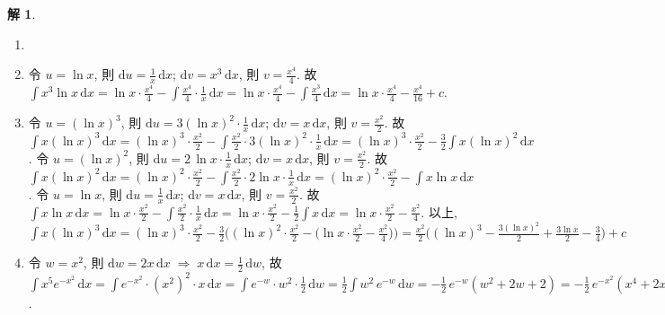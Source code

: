 \documentclass[12pt,a4paper]{extarticle}
\newcommand{\ds}{\displaystyle}
\newcommand{\ie}{\;\Longrightarrow\;}
\theoremstyle{definition}
\newtheorem*{sol}{解}
\begin{document}
\begin{sol}
  \begin{enumerate}\setlength{\itemsep}{0pt}
    \item[]
    \item 令 $\ds u = \ln x$, 則 $\ds\text{d}u = \frac{1}{x}\,\text{d}x$; $\ds\text{d}v = x^3\,\text{d}x$, 則 $\ds v = \frac{x^4}{4}$.  故 $\ds\int x^3\ln x\,\mathrm{d}x = \ln x\cdot\frac{x^4}{4} - \int\!\frac{x^4}{4}\cdot\frac{1}{x}\,\text{d}x = \ln x\cdot\frac{x^4}{4} - \int\!\frac{x^3}{4}\,\text{d}x = \ln x\cdot\frac{x^4}{4} - \frac{x^4}{16} + c$.   
    \item 令 $\ds u = (\ln x)^3$, 則 $\ds\text{d}u = 3(\ln x)^2\cdot\frac{1}{x}\,\text{d}x$; $\ds\text{d}v = x\,\text{d}x$, 則 $\ds v = \frac{x^2}{2}$.  故 $\ds\int x(\ln x)^3\,\mathrm{d}x = (\ln x)^3\cdot\frac{x^2}{2} - \int\!\frac{x^2}{2}\cdot 3(\ln x)^2\cdot\frac{1}{x}\,\text{d}x = (\ln x)^3\cdot\frac{x^2}{2} - \frac{3}{2}\int x(\ln x)^2\,\text{d}x$. 令 $\ds u = (\ln x)^2$, 則 $\ds\text{d}u = 2\,\ln x\cdot\frac{1}{x}\,\text{d}x$; $\ds\text{d}v = x\,\text{d}x$, 則 $\ds v = \frac{x^2}{2}$.  故 $\ds\int x(\ln x)^2\,\text{d}x = (\ln x)^2\cdot\frac{x^2}{2} - \int\!\frac{x^2}{2}\cdot 2\ln x\cdot\frac{1}{x}\,\text{d}x = (\ln x)^2\cdot\frac{x^2}{2} - \int x\ln x\,\text{d}x$. 令 $\ds u = \ln x$, 則 $\ds\text{d}u = \frac{1}{x}\,\text{d}x$; $\ds\text{d}v = x\,\text{d}x$, 則 $\ds v = \frac{x^2}{2}$. 故 $\ds\int x\ln x\,\text{d}x = \ln x\cdot\frac{x^2}{2} - \int\!\frac{x^2}{2}\cdot\frac{1}{x}\,\text{d}x = \ln x\cdot\frac{x^2}{2} - \frac{1}{2}\int x\,\text{d}x = \ln x\cdot\frac{x^2}{2} - \frac{x^2}{4}$. 以上, $\ds\int x(\ln x)^3\,\mathrm{d}x = (\ln x)^3\cdot\frac{x^2}{2} - \frac{3}{2}\Big((\ln x)^2\cdot\frac{x^2}{2} - \big(\ln x\cdot\frac{x^2}{2} - \frac{x^2}{4}\big)\Big) = \frac{x^2}{2}\big((\ln x)^3 - \frac{3(\ln x)^2}{2} + \frac{3\ln x}{2} - \frac{3}{4}\big) + c$
    \item 令 $\ds w = x^2$, 則 $\ds\text{d}w = 2x\,\text{d}x\ie x\,\text{d}x = \frac{1}{2}\,\text{d}w$, 故 $\ds\int x^5 e^{-x^2}\,\text{d}x = \int e^{-x^2}\cdot(x^2)^2\cdot x\,\text{d}x = \int e^{-w}\cdot w^2\cdot\frac{1}{2}\,\text{d}w = \frac{1}{2}\int w^2\,e^{-w}\,\text{d}w = -\frac{1}{2}\,e^{-w}(w^2 + 2w + 2) = -\frac{1}{2}\,e^{-x^2}(x^4 + 2x^2 + 2) + c$. \\
  \begin{minipage}{0.15\textwidth}
\end{minipage}
\end{enumerate}
\end{sol}
\end{document}
